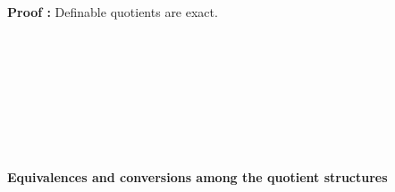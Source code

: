 \textbf{Proof :} Definable quotients are exact.

\begin{code}\>\<%
\\
\>[0]\<[2]%
\>[2] \AgdaSymbol{:}  \AgdaSymbol{\}}  \AgdaFunction{[}  \AgdaFunction{]}  \AgdaFunction{[}  \AgdaFunction{]}   \AgdaFunction{\textasciitilde} \<%
\\
\>[0]\<[2]%
\>[2] \AgdaSymbol{\{}\AgdaSymbol{\}} \AgdaSymbol{\{}\AgdaSymbol{\}}  \AgdaSymbol{=} \<[20]%
\>[20]\<%
\\
\>[2]\<[4]%
\>[4] \AgdaSymbol{(} \AgdaSymbol{(} \AgdaSymbol{))} \<[33]%
\>[33]\<%
\\
\>[2]\<[4]%
\>[4]\AgdaSymbol{(} \AgdaSymbol{(}    \<[27]%
\>[27]\<%
\\
\>[2]\<[4]%
\>[4] \AgdaFunction{[}  \AgdaFunction{]} \AgdaFunction{\textasciitilde}  \AgdaSymbol{)} \<[23]%
\>[23]\<%
\\
\>[2]\<[4]%
\>[4] \AgdaSymbol{)} \AgdaSymbol{(} \AgdaSymbol{))}\<%
\\
\>\<\end{code}


\textbf{Equivalences and conversions among the quotient structures}

